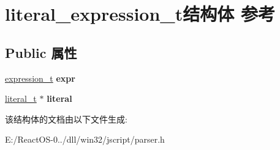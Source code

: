 \hypertarget{structliteral__expression__t}{}\section{literal\+\_\+expression\+\_\+t结构体 参考}
\label{structliteral__expression__t}
\subsection*{Public 属性}
\begin{DoxyCompactItemize}
\item 
\mbox{\label{structliteral__expression__t_afd9d612f2c48d7d6b331479d3aeebae2}} 
\hyperlink{struct__expression__t}{expression\+\_\+t} {\bfseries expr}
\item 
\mbox{\label{structliteral__expression__t_a78a04c2d915477f801924330ce2eb0df}} 
\hyperlink{structliteral__t}{literal\+\_\+t} $\ast$ {\bfseries literal}
\end{DoxyCompactItemize}


该结构体的文档由以下文件生成\+:\begin{DoxyCompactItemize}
\item 
E\+:/\+React\+O\+S-\/0../dll/win32/jscript/parser.\+h\end{DoxyCompactItemize}
